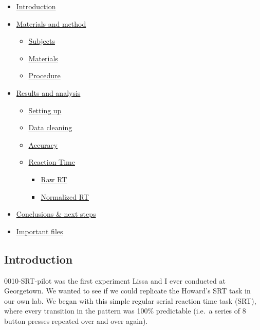 \documentclass[11pt]{article}
\providecommand{\tightlist}{%
      \setlength{\itemsep}{0pt}\setlength{\parskip}{0pt}}
\begin{document}
    \begin{itemize}
\tightlist
\item
  \protect\hyperlink{Introduction}{Introduction}
\item
  \protect\hyperlink{Materials-and-method}{Materials and method}

  \begin{itemize}
  \tightlist
  \item
    \protect\hyperlink{Subjects}{Subjects}
  \item
    \protect\hyperlink{Materials}{Materials}
  \item
    \protect\hyperlink{Procedure}{Procedure}
  \end{itemize}
\item
  \protect\hyperlink{Results-and-analysis}{Results and analysis}

  \begin{itemize}
  \tightlist
  \item
    \protect\hyperlink{Setting-up}{Setting up}
  \item
    \protect\hyperlink{Data-cleaning}{Data cleaning}
  \item
    \protect\hyperlink{Accuracy}{Accuracy}
  \item
    \protect\hyperlink{Reaction-time}{Reaction Time}

    \begin{itemize}
    \tightlist
    \item
      \protect\hyperlink{Raw-RT}{Raw RT}
    \item
      \protect\hyperlink{Normalized-RT}{Normalized RT}
    \end{itemize}
  \end{itemize}
\item
  \protect\hyperlink{Conclusions-ux5cux26-next-steps}{Conclusions \&
  next steps}
\item
  \protect\hyperlink{Important-files}{Important files}
\end{itemize}

    \subsection{Introduction}\label{introduction}

0010-SRT-pilot was the first experiment Lissa and I ever conducted at
Georgetown. We wanted to see if we could replicate the Howard's SRT task
in our own lab. We began with this simple regular serial reaction time
task (SRT), where every transition in the pattern was 100\% predictable
(i.e.~a series of 8 button presses repeated over and over again).
\end{document}
